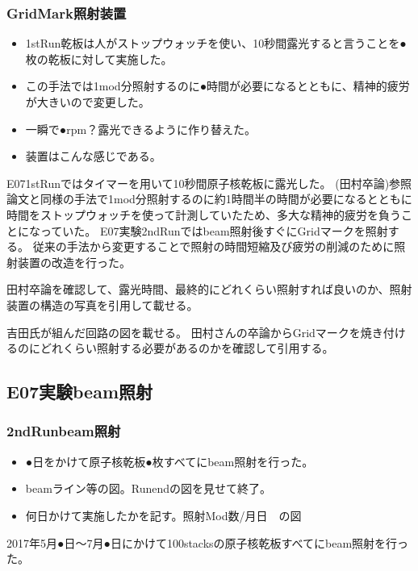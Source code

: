 \documentclass[12pt,a4paper]{jarticle}
\begin{document}
\subsubsection{GridMark照射装置}
\begin{itemize}
 \item 1stRun乾板は人がストップウォッチを使い、10秒間露光すると言うことを●枚の乾板に対して実施した。
 \item この手法では1mod分照射するのに●時間が必要になるとともに、精神的疲労が大きいので変更した。
 \item 一瞬で●rpm？露光できるように作り替えた。
 \item 装置はこんな感じである。
\end{itemize}
E071stRunではタイマーを用いて10秒間原子核乾板に露光した。
(田村卒論)参照論文と同様の手法で1mod分照射するのに約1時間半の時間が必要になるとともに時間をストップウォッチを使って計測していたため、多大な精神的疲労を負うことになっていた。
E07実験2ndRunではbeam照射後すぐにGridマークを照射する。
従来の手法から変更することで照射の時間短縮及び疲労の削減のために照射装置の改造を行った。
\par
田村卒論を確認して、露光時間、最終的にどれくらい照射すれば良いのか、照射装置の構造の写真を引用して載せる。
\par
吉田氏が組んだ回路の図を載せる。
田村さんの卒論からGridマークを焼き付けるのにどれくらい照射する必要があるのかを確認して引用する。
\subsection{E07実験beam照射}
\subsubsection{2ndRunbeam照射}
\begin{itemize}
 \item ●日をかけて原子核乾板●枚すべてにbeam照射を行った。
 \item beamライン等の図。Runendの図を見せて終了。
 \item 何日かけて実施したかを記す。照射Mod数/月日　の図
\end{itemize}
2017年5月●日～7月●日にかけて100stacksの原子核乾板すべてにbeam照射を行った。
\end{document}

